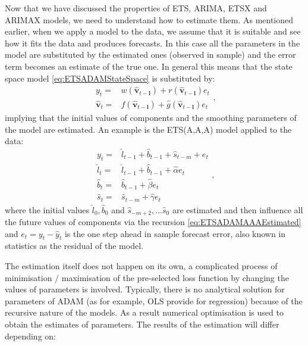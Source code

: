 \documentclass[
]{book}
\theoremstyle{definition}
\theoremstyle{definition}
\theoremstyle{definition}
\theoremstyle{definition}
\theoremstyle{remark}
\begin{document}
Now that we have discussed the properties of ETS, ARIMA, ETSX and ARIMAX models, we need to understand how to estimate them. As mentioned earlier, when we apply a model to the data, we assume that it is suitable and see how it fits the data and produces forecasts. In this case all the parameters in the model are substituted by the estimated ones (observed in sample) and the error term becomes an estimate of the true one. In general this means that the state space model \eqref{eq:ETSADAMStateSpace} is substituted by:
\begin{equation}
  \begin{aligned}
    {y}_{t} = &w(\hat{\mathbf{v}}_{t-\boldsymbol{l}}) + r(\hat{\mathbf{v}}_{t-\boldsymbol{l}}) e_t \\
    \hat{\mathbf{v}}_{t} = &f(\hat{\mathbf{v}}_{t-\boldsymbol{l}}) + \hat{g}(\hat{\mathbf{v}}_{t-\boldsymbol{l}}) e_t
  \end{aligned},
  \label{eq:ETSADAMStateSpaceEstimated}
\end{equation}
implying that the initial values of components and the smoothing parameters of the model are estimated. An example is the ETS(A,A,A) model applied to the data:
\begin{equation}
  \begin{aligned}
    y_{t} = & \hat{l}_{t-1} + \hat{b}_{t-1} + \hat{s}_{t-m} + e_t \\
    \hat{l}_t = & \hat{l}_{t-1} + \hat{b}_{t-1} + \hat{\alpha} e_t \\
    \hat{b}_t = & \hat{b}_{t-1} + \hat{\beta} e_t \\
    \hat{s}_t = & \hat{s}_{t-m} + \hat{\gamma} e_t 
  \end{aligned},
  \label{eq:ETSADAMAAAEstimated}
\end{equation}
where the initial values \(\hat{l}_0, \hat{b}_0\) and \(\hat{s}_{-m+2}, ... \hat{s}_0\) are estimated and then influence all the future values of components via the recursion \eqref{eq:ETSADAMAAAEstimated} and \(e_t = y_t -\hat{y}_t\) is the one step ahead in sample forecast error, also known in statistics as the residual of the model.

The estimation itself does not happen on its own, a complicated process of minimisation / maximisation of the pre-selected loss function by changing the values of parameters is involved. Typically, there is no analytical solution for parameters of ADAM (as for example, OLS provide for regression) because of the recursive nature of the models. As a result numerical optimisation is used to obtain the estimates of parameters. The results of the estimation will differ depending on:
\end{document}
